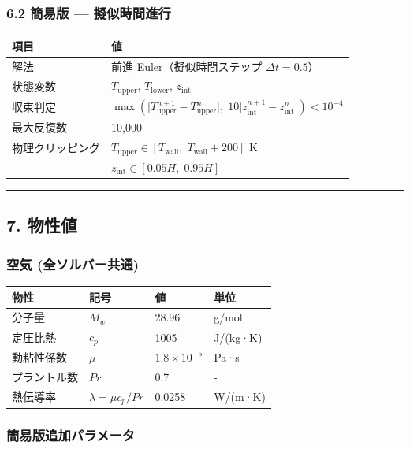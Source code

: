 \documentclass[a4paper,11pt]{article}
\begin{document}
\subsubsection{6.2 簡易版 — 擬似時間進行}

{\small
\noindent
\begin{tabularx}{\textwidth}{|L|L|}
\hline
\textbf{項目} & \textbf{値} \\
\hline
解法 & 前進 Euler（擬似時間ステップ $\Delta t = 0.5$） \\
\hline
状態変数 & $T_{\text{upper}}$, $T_{\text{lower}}$, $z_{\text{int}}$ \\
\hline
収束判定 & $\max(\lvert T_{\text{upper}}^{n+1} - T_{\text{upper}}^n \rvert, \; 10 \lvert z_{\text{int}}^{n+1} - z_{\text{int}}^n \rvert) < 10^{-4}$ \\
\hline
最大反復数 & 10,000 \\
\hline
物理クリッピング & $T_{\text{upper}} \in [T_{\text{wall}},\; T_{\text{wall}}+200]$ K \\
\hline
 & $z_{\text{int}} \in [0.05H,\; 0.95H]$ \\
\hline
\end{tabularx}
}


\bigskip\hrule\bigskip

\subsection{7. 物性値}

\subsubsection{空気 (全ソルバー共通)}

{\small
\noindent
\begin{tabularx}{\textwidth}{|l|L|L|L|}
\hline
\textbf{物性} & \textbf{記号} & \textbf{値} & \textbf{単位} \\
\hline
分子量 & $M_w$ & 28.96 & g/mol \\
\hline
定圧比熱 & $c_p$ & 1005 & J/(kg·K) \\
\hline
動粘性係数 & $\mu$ & $1.8 \times 10^{-5}$ & Pa·s \\
\hline
プラントル数 & $Pr$ & 0.7 & - \\
\hline
熱伝導率 & $\lambda = \mu c_p / Pr$ & 0.0258 & W/(m·K) \\
\hline
\end{tabularx}
}


\subsubsection{簡易版追加パラメータ}
\end{document}
